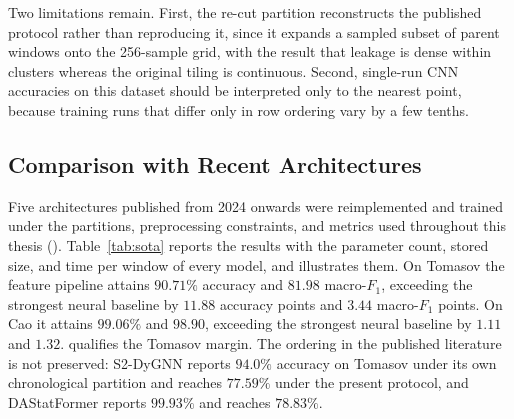 Two limitations remain. First, the re-cut partition reconstructs the published protocol rather than reproducing it, since it expands a sampled subset of parent windows onto the 256-sample grid, with the result that leakage is dense within clusters whereas the original tiling is continuous. Second, single-run CNN accuracies on this dataset should be interpreted only to the nearest point, because training runs that differ only in row ordering vary by a few tenths.

\subsection{Comparison with Recent Architectures}
\label{sec:resSOTA}
Five architectures published from 2024 onwards were reimplemented and trained under the partitions, preprocessing constraints, and metrics used throughout this thesis (). Table~\ref{tab:sota} reports the results with the parameter count, stored size, and time per window of every model, and  illustrates them. On Tomasov the feature pipeline attains $90.71\%$ accuracy and $81.98$ macro-$F_1$, exceeding the strongest neural baseline by $11.88$ accuracy points and $3.44$ macro-$F_1$ points. On Cao it attains $99.06\%$ and $98.90$, exceeding the strongest neural baseline by $1.11$ and $1.32$.  qualifies the Tomasov margin. The ordering in the published literature is not preserved: S2-DyGNN reports $94.0\%$ accuracy on Tomasov under its own chronological partition and reaches $77.59\%$ under the present protocol, and DAStatFormer reports $99.93\%$ and reaches $78.83\%$.

